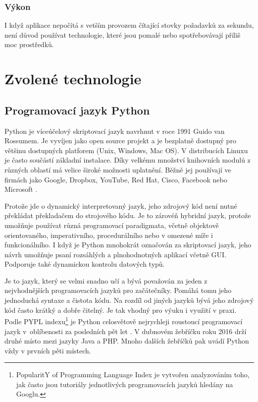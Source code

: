 \subsubsection*{Výkon}
I když aplikace nepočítá s vetším provozem čítající stovky požadavků za sekundu, není důvod používat technologie, které jsou pomalé
nebo spotřebovávají příliš moc prostředků.

\section{Zvolené technologie}

\subsection{Programovací jazyk Python}

\indent

Python je víceúčelový skriptovací jazyk navrhnut v roce 1991 \cite{python-year} Guido van Rossumem.
Je vyvíjen jako open source projekt a je bezplatně dostupný pro většinu dostupných platforem (Unix, Windows, Mac OS).
V distribucích Linuxu je často součástí základní instalace. Díky velkému množství knihovních modulů z různých oblastí
má velice široké možnosti uplatnění. Běžně jej používají ve firmách jako Google, Dropbox, YouTube, Red Hat, Cisco,
Facebook nebo Microsoft \cite{python-companies}.

\medskip

Protože jde o dynamický interpretovaný jazyk, jeho zdrojový kód není nutné překládat překladačem do strojového kódu.
Je to zárovéň hybridní jazyk, protože umožňuje používat různá programovací paradigmata, včetně objektově orientovaného,
imperativního, procedurálního nebo v omezené míře i funkcionálního. I když je Python mnohokrát označován za skriptovací jazyk,
jeho návrh umožňuje psaní rozsáhlých a plnohodnotných aplikací včetně GUI. Podporuje také dynamickou kontrolu datových typů.

\medskip

Je to jazyk, který se velmi snadno učí a bývá považován za jeden z nejvhodnějších programovacích jazyků pro začátečníky.
Pomáhá tomu jeho jednoduchá syntaxe a čistota kódu. Na rozdíl od jiných jazyků bývá jeho zdrojový kód často krátký a dobře čitelný.
Je tak vhodný pro výuku i využití v praxi. Podle PYPL indexu\footnote{PopularitY of Programming Language Index je vytvořen analyzováním toho,
jak často jsou tutoriály jednotlivých programovacích jazyků hledány na Googlu.} je Python celosvětově nejrychleji roustoucí programovací jazyk
v~oblíbenosti za posledních pět let \cite{python-pypl}.
V dubnovém žebříčku roku 2016 drží druhé místo mezi jazyky Java a PHP. Mnoho dalších žebříčků pak uvádí Python vždy v prvních pěti místech.

